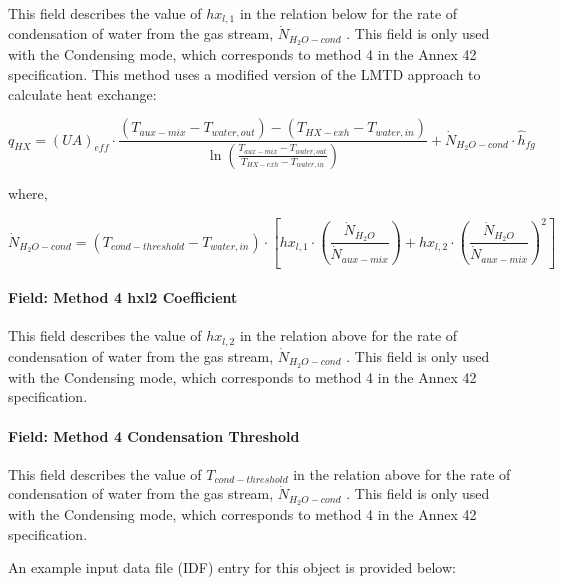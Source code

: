 This field describes the value of \(h{x_{l,1}}\) in the relation below for the rate of condensation of water from the gas stream, \({\dot N_{{H_2}O - cond}}\) . This field is only used with the Condensing mode, which corresponds to method 4 in the Annex 42 specification. This method uses a modified version of the LMTD approach to calculate heat exchange:

\begin{equation}
{q_{HX}} = {\left( {UA} \right)_{eff}} \cdot \frac{{\left( {{T_{aux - mix}} - {T_{water,out}}} \right) - \left( {{T_{HX - exh}} - {T_{water,in}}} \right)}}{{\ln \left( {\frac{{{T_{aux - mix}} - {T_{water,out}}}}{{{T_{HX - exh}} - {T_{water,in}}}}} \right)}} + {\dot N_{{H_2}O - cond}} \cdot {\hat h_{fg}}
\end{equation}

where,

\begin{equation}
{\dot N_{{H_2}O - cond}} = \left( {{T_{cond - threshold}} - {T_{water,in}}} \right) \cdot \left[ {h{x_{l,1}} \cdot \left( {\frac{{{{\dot N}_{{H_2}O}}}}{{{{\dot N}_{aux - mix}}}}} \right) + h{x_{l,2}} \cdot {{\left( {\frac{{{{\dot N}_{{H_2}O}}}}{{{{\dot N}_{aux - mix}}}}} \right)}^2}} \right]
\end{equation}

\paragraph{Field: Method 4 hxl2 Coefficient}\label{field-method-4-hxl2-coefficient}

This field describes the value of \(h{x_{l,2}}\) in the relation above for the rate of condensation of water from the gas stream, \({\dot N_{{H_2}O - cond}}\) . This field is only used with the Condensing mode, which corresponds to method 4 in the Annex 42 specification.

\paragraph{Field: Method 4 Condensation Threshold}\label{field-method-4-condensation-threshold}

This field describes the value of \({T_{cond - threshold}}\) in the relation above for the rate of condensation of water from the gas stream, \({\dot N_{{H_2}O - cond}}\) . This field is only used with the Condensing mode, which corresponds to method 4 in the Annex 42 specification.

An example input data file (IDF) entry for this object is provided below:

